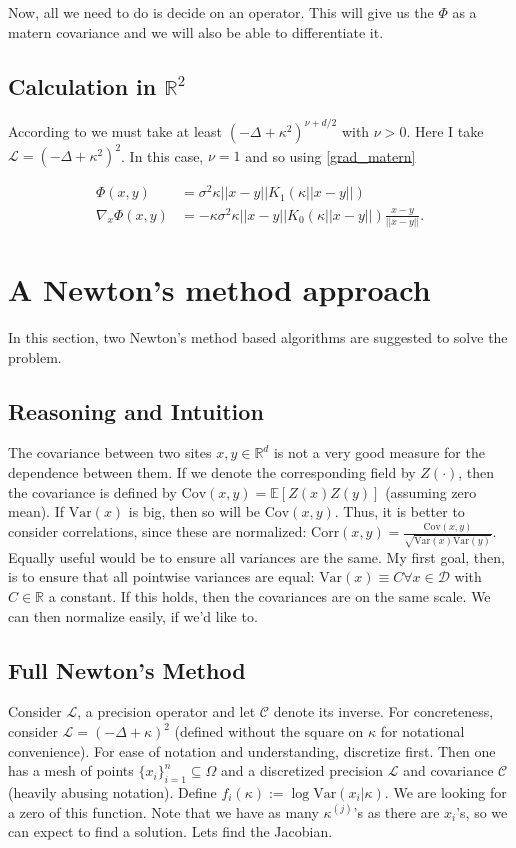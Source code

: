 \documentclass[paper=a4, fontsize=11pt]{scrartcl} %
\numberwithin{equation}{section} %
\numberwithin{figure}{section} %
\numberwithin{table}{section} %
\newcommand{\Op}{\mathcal{L}}
\newcommand{\var}{\text{Var}}
\newcommand{\corr}{\text{Corr}}
\newcommand{\dom}{\mathcal{D}}
\newcommand{\cov}{\text{Cov}}
\begin{document}
Now, all we need to do is decide on an operator. This will give us the $\Phi$ as a matern covariance and we will also
be able to differentiate it. 

\subsection{Calculation in $\mathbb{R}^2$}

According to \cite{stuart2010inverse} we must take at least $(-\Delta + \kappa^2)^{\nu + d/2}$ with $\nu > 0$. Here I take 
$\Op =(-\Delta + \kappa^2 )^2$. In this case, $\nu = 1$ and so using \ref{grad_matern}

\begin{align*}
  \Phi(x,y) &= \sigma^2 \kappa||x-y|| K_{1}(\kappa ||x-y||) \\
  \nabla_{x}\Phi(x,y) &= -\kappa  \sigma^2 \kappa||x-y|| K_{0}(\kappa ||x-y||) \frac{x-y}{||x-y||}.
\end{align*}

\section{A Newton's method approach}
In this section, two Newton's method based algorithms are suggested to solve the problem. 

\subsection{Reasoning and Intuition}
The covariance between two sites $x,y \in \mathbb{R}^d$ is not a very good measure for the dependence 
between them. If we denote the corresponding field by $Z( \cdot )$, then the covariance is 
defined by $\cov (x,y) =\mathbb{E}[Z(x) Z(y)]$ (assuming zero mean). If $\var(x)$ is big,
then so will be $\cov (x,y)$. Thus, it is better to consider correlations, since 
these are normalized: $\corr(x,y) = \frac{\cov (x,y)}{\sqrt{\var(x)\var(y)}}$. Equally useful
would be to ensure all variances are the same. My first goal, then, is to ensure
that all pointwise variances are equal: $\var(x) \equiv C \forall x \in \dom$ with $C \in \mathbb{R}$ a 
constant. If this holds,
then the covariances are on the same scale. We can then normalize easily, if we'd like to.

\subsection{Full Newton's Method}
Consider $\Op$, a precision operator and let $\mathcal{C}$ denote
its inverse. For concreteness,
consider $\Op = (-\Delta + \kappa)^2$ (defined without the
square on $\kappa$ for notational convenience). For ease of notation and 
understanding, discretize first. Then one has a mesh of
points $\{x_i\}_{i=1}^n \subseteq \Omega$ and a discretized
precision $\Op$ and covariance $\mathcal{C}$ (heavily abusing notation).
Define $f_{i}(\kappa) :=\log \var( x_i | \kappa)$. We 
are looking for a zero of this function. Note that we
have as many $\kappa^{(j)}$'s as there are $x_i$'s,
so we can expect to find a solution. Lets find the Jacobian.
\end{document}
